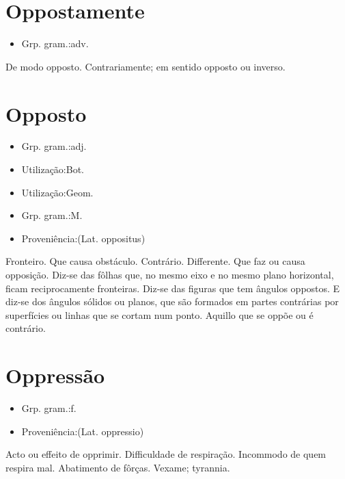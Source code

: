 \section{Oppostamente}
\begin{itemize}
\item {Grp. gram.:adv.}
\end{itemize}
De modo opposto.
Contrariamente; em sentido opposto ou inverso.
\section{Opposto}
\begin{itemize}
\item {Grp. gram.:adj.}
\end{itemize}
\begin{itemize}
\item {Utilização:Bot.}
\end{itemize}
\begin{itemize}
\item {Utilização:Geom.}
\end{itemize}
\begin{itemize}
\item {Grp. gram.:M.}
\end{itemize}
\begin{itemize}
\item {Proveniência:(Lat. \textunderscore oppositus\textunderscore )}
\end{itemize}
Fronteiro.
Que causa obstáculo.
Contrário.
Differente.
Que faz ou causa opposição.
Diz-se das fôlhas que, no mesmo eixo e no mesmo plano horizontal, ficam reciprocamente fronteiras.
Diz-se das figuras que tem ângulos oppostos.
E diz-se dos ângulos sólidos ou planos, que são formados em partes contrárias por superfícies ou linhas que se cortam num ponto.
Aquillo que se oppõe ou é contrário.
\section{Oppressão}
\begin{itemize}
\item {Grp. gram.:f.}
\end{itemize}
\begin{itemize}
\item {Proveniência:(Lat. \textunderscore oppressio\textunderscore )}
\end{itemize}
Acto ou effeito de opprimir.
Difficuldade de respiração.
Incommodo de quem respira mal.
Abatimento de fôrças.
Vexame; tyrannia.
